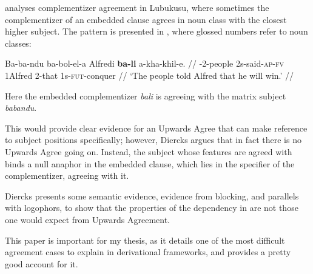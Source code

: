 
\citet{diercks2013} analyses complementizer agreement in Lubukusu, where sometimes the complementizer of an embedded clause agrees in noun class with the closest higher subject. The pattern is presented in \Next, where glossed numbers refer to noun classes:

\ex \begingl \gla Ba-ba-ndu ba-bol-el-a Alfredi \textbf{ba-li} a-kha-khil-e. //
    -2-people 2s-said-\textsc{ap-fv} 1Alfred 2-that 1s-\textsc{fut}-conquer //
    \glft `The people told Alfred that he will win.' //
    \endgl
\xe

Here the embedded complementizer \textit{bali} is agreeing with the matrix subject \textit{babandu}.

This would provide clear evidence for an Upwards Agree that can make reference to subject positions specifically; however, Diercks argues that in fact there is no Upwards Agree going on. Instead, the subject whose features are agreed with binds a null anaphor in the embedded clause, which lies in the specifier of the complementizer, agreeing with it.

Diercks presents some semantic evidence, evidence from blocking, and parallels with logophors, to show that the properties of the dependency in \Last{} are not those one would expect from Upwards Agreement.

This paper is important for my thesis, as it details one of the most difficult agreement cases to explain in derivational frameworks, and provides a pretty good account for it.
